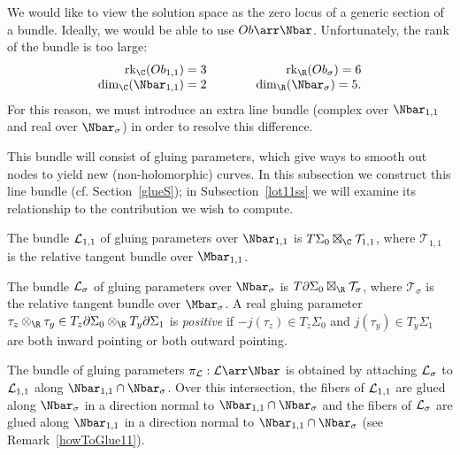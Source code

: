 We would like to view the solution space as the zero locus of a generic section of a bundle. Ideally, we would be able to use $Ob \arr \Nbar$. Unfortunately, the rank of the bundle is too large: 
\[
\begin{array}{rcr}
\rk_\C(Ob_{1,1})	 = 3 & \qquad & \rk_\R(Ob_\sigma) = 6
\\
\dim_\C(\Nbar_{1,1}) = 2 && \dim_\R(\Nbar_\sigma) = 5.
\end{array}
\]
For this reason, we must introduce an extra line bundle (complex over $\Nbar_{1,1}$ and real over $\Nbar_\sigma$) in order to resolve this difference.

This bundle will consist of gluing parameters, which give ways to smooth out nodes to yield new (non-holomorphic) curves. In this subsection we construct this line bundle (cf. Section~\ref{glueS}); in Subsection~\ref{lot11ss} we will examine its relationship to the contribution we wish to compute.

\begin{definition}
The bundle $\mathcal{L}_{1,1}$ of gluing parameters over $\Nbar_{1,1}$ is $T\Sigma_0 \boxtimes_\C \mathcal{T}_{1,1}$, where $\mathcal{T}_{1,1}$ is the relative tangent bundle over $\Mbar_{1,1}$.

The bundle $\mathcal{L}_\sigma$ of gluing parameters over $\Nbar_\sigma$ is $T\partial\Sigma_0 \boxtimes_\R \mathcal{T}_\sigma$, where $\mathcal{T}_\sigma$ is the relative tangent bundle over $\Mbar_\sigma$. 
A real gluing parameter $\tau_z \otimes_\R \tau_y \in T_z\partial\Sigma_0 \otimes_\R T_y\partial\Sigma_1$ is \emph{positive} if $-j(\tau_z) \in T_z\Sigma_0$ and $j(\tau_y) \in T_y\Sigma_1$ are both inward pointing or both outward pointing.

The bundle of gluing parameters $\pi_\L:\L \arr \Nbar$ is obtained by attaching $\mathcal{L}_\sigma$ to $\mathcal{L}_{1,1}$ along $\Nbar_{1,1} \cap \Nbar_\sigma$. 
Over this intersection, the fibers of $\mathcal{L}_{1,1}$ are glued along $\Nbar_\sigma$ in a direction normal to $\Nbar_{1,1} \cap \Nbar_\sigma$ and the fibers of $\mathcal{L}_\sigma$ are glued along $\Nbar_{1,1}$ in a direction normal to $\Nbar_{1,1} \cap \Nbar_\sigma$ (see Remark~\ref{howToGlue11}).
\end{definition}


